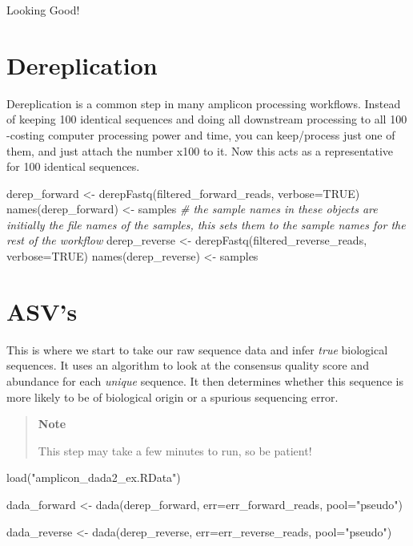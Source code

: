 \documentclass[
]{book}
\newenvironment{Shaded}{\begin{snugshade}}{\end{snugshade}}
\newcommand{\AttributeTok}[1]{\textcolor[rgb]{0.77,0.63,0.00}{#1}}
\newcommand{\CommentTok}[1]{\textcolor[rgb]{0.56,0.35,0.01}{\textit{#1}}}
\newcommand{\ConstantTok}[1]{\textcolor[rgb]{0.00,0.00,0.00}{#1}}
\newcommand{\FunctionTok}[1]{\textcolor[rgb]{0.00,0.00,0.00}{#1}}
\newcommand{\NormalTok}[1]{#1}
\newcommand{\OtherTok}[1]{\textcolor[rgb]{0.56,0.35,0.01}{#1}}
\newcommand{\StringTok}[1]{\textcolor[rgb]{0.31,0.60,0.02}{#1}}
\begin{document}
Looking Good!

\hypertarget{dereplication}{%
\section{Dereplication}\label{dereplication}}

Dereplication is a common step in many amplicon processing workflows. Instead of keeping 100 identical sequences and doing all downstream processing to all 100 -costing computer processing power and time, you can keep/process just one of them, and just attach the number x100 to it. Now this acts as a representative for 100 identical sequences.

\begin{Shaded}
\begin{Highlighting}[]
\NormalTok{derep\_forward }\OtherTok{\textless{}{-}} \FunctionTok{derepFastq}\NormalTok{(filtered\_forward\_reads, }\AttributeTok{verbose=}\ConstantTok{TRUE}\NormalTok{)}
\FunctionTok{names}\NormalTok{(derep\_forward) }\OtherTok{\textless{}{-}}\NormalTok{ samples }\CommentTok{\# the sample names in these objects are initially the file names of the samples, this sets them to the sample names for the rest of the workflow}
\NormalTok{derep\_reverse }\OtherTok{\textless{}{-}} \FunctionTok{derepFastq}\NormalTok{(filtered\_reverse\_reads, }\AttributeTok{verbose=}\ConstantTok{TRUE}\NormalTok{)}
\FunctionTok{names}\NormalTok{(derep\_reverse) }\OtherTok{\textless{}{-}}\NormalTok{ samples}
\end{Highlighting}
\end{Shaded}

\hypertarget{asvs}{%
\section{ASV's}\label{asvs}}

This is where we start to take our raw sequence data and infer \emph{true} biological sequences.
It uses an algorithm to look at the consensus quality score and abundance for each \emph{unique} sequence. It then determines whether this sequence is more likely to be of biological origin or a spurious sequencing error.

\begin{quote}
\textbf{Note}

This step may take a few minutes to run, so be patient!
\end{quote}

\begin{Shaded}
\begin{Highlighting}[]
\FunctionTok{load}\NormalTok{(}\StringTok{"amplicon\_dada2\_ex.RData"}\NormalTok{)}

\NormalTok{dada\_forward }\OtherTok{\textless{}{-}} \FunctionTok{dada}\NormalTok{(derep\_forward, }\AttributeTok{err=}\NormalTok{err\_forward\_reads, }\AttributeTok{pool=}\StringTok{"pseudo"}\NormalTok{)}

\NormalTok{dada\_reverse }\OtherTok{\textless{}{-}} \FunctionTok{dada}\NormalTok{(derep\_reverse, }\AttributeTok{err=}\NormalTok{err\_reverse\_reads, }\AttributeTok{pool=}\StringTok{"pseudo"}\NormalTok{)}
\end{Highlighting}
\end{Shaded}
\end{document}
